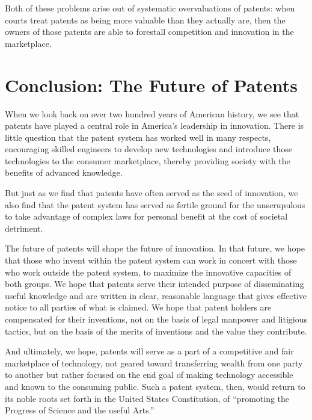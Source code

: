 \documentclass[11pt,twocolumn,titlepage]{article}
\begin{document}
Both of these problems arise out of systematic overvaluations of patents: when
courts treat patents as being more valuable than they actually are, then the
owners of those patents are able to forestall competition and innovation in the
marketplace.

\section{Conclusion: The Future of Patents}

When we look back on over two hundred years of American history, we see that
patents
have played a central role in America's leadership in innovation. There is
little question that the patent system has worked well in many respects,
encouraging skilled engineers to develop new technologies and introduce those
technologies to the consumer marketplace, thereby providing society with the
benefits of advanced knowledge.

But just as we find that patents have often served as the seed of innovation,
we also find that the patent system has served as fertile ground for the
unscrupulous to take advantage of complex laws for personal benefit at the
cost of societal detriment. 

The future of patents will shape the future of innovation. In that future, we
hope that
those who invent within the patent system can work in concert with those who
work outside the patent system, to maximize the innovative capacities of both
groups. We hope that patents serve their intended purpose of disseminating
useful knowledge and are written in clear, reasonable language that gives
effective notice to all parties of what is claimed. We hope that patent holders
are compensated for their inventions, not on the basis of legal manpower and
litigious tactics, but on the basis of the merits of inventions and the value
they contribute.

And ultimately, we hope, patents will serve as a part of a competitive and fair
marketplace of technology, not geared toward transferring wealth from one party
to another but rather focused on the end goal of making technology accessible
and known to the consuming public. Such a patent system, then, would return to
its noble roots set forth in the United States Constitution, of ``promoting the
Progress of Science and the useful Arts.''
\end{document}
